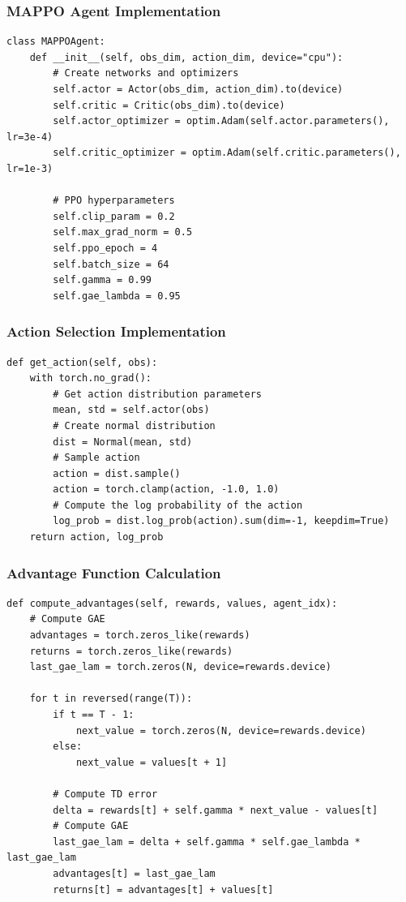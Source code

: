 \documentclass[12pt]{article}
\begin{document}
\subsubsection{MAPPO Agent Implementation}
\begin{verbatim}
class MAPPOAgent:
    def __init__(self, obs_dim, action_dim, device="cpu"):
        # Create networks and optimizers
        self.actor = Actor(obs_dim, action_dim).to(device)
        self.critic = Critic(obs_dim).to(device)
        self.actor_optimizer = optim.Adam(self.actor.parameters(), lr=3e-4)
        self.critic_optimizer = optim.Adam(self.critic.parameters(), lr=1e-3)
        
        # PPO hyperparameters
        self.clip_param = 0.2
        self.max_grad_norm = 0.5
        self.ppo_epoch = 4
        self.batch_size = 64
        self.gamma = 0.99
        self.gae_lambda = 0.95
\end{verbatim}

\subsubsection{Action Selection Implementation}
\begin{verbatim}
def get_action(self, obs):
    with torch.no_grad():
        # Get action distribution parameters
        mean, std = self.actor(obs)
        # Create normal distribution
        dist = Normal(mean, std)
        # Sample action
        action = dist.sample()
        action = torch.clamp(action, -1.0, 1.0)
        # Compute the log probability of the action
        log_prob = dist.log_prob(action).sum(dim=-1, keepdim=True)
    return action, log_prob
\end{verbatim}

\subsubsection{Advantage Function Calculation}
\begin{verbatim}
def compute_advantages(self, rewards, values, agent_idx):
    # Compute GAE
    advantages = torch.zeros_like(rewards)
    returns = torch.zeros_like(rewards)
    last_gae_lam = torch.zeros(N, device=rewards.device)
    
    for t in reversed(range(T)):
        if t == T - 1:
            next_value = torch.zeros(N, device=rewards.device)
        else:
            next_value = values[t + 1]
        
        # Compute TD error
        delta = rewards[t] + self.gamma * next_value - values[t]
        # Compute GAE
        last_gae_lam = delta + self.gamma * self.gae_lambda * last_gae_lam
        advantages[t] = last_gae_lam
        returns[t] = advantages[t] + values[t]
\end{verbatim}
\end{document}

